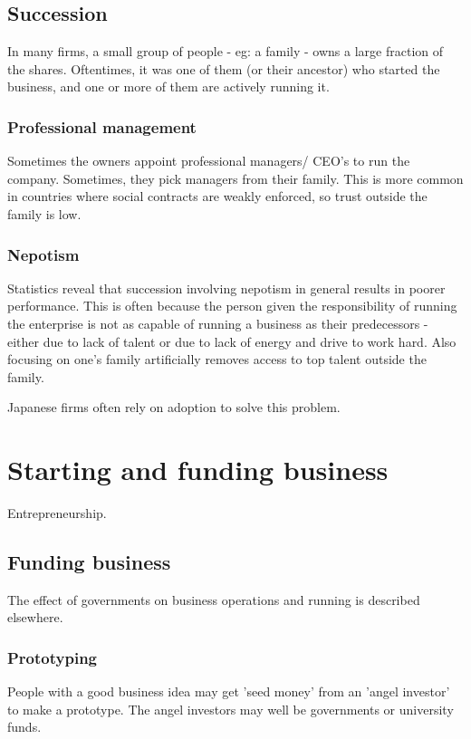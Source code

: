 \documentclass[oneside, article]{memoir}
\begin{document}
\subsection{Succession}
In many firms, a small group of people - eg: a family - owns a large fraction of the shares. Oftentimes, it was one of them (or their ancestor) who started the business, and one or more of them are actively running it.

\subsubsection{Professional management}
Sometimes the owners appoint professional managers/ CEO's to run the company. Sometimes, they pick managers from their family. This is more common in countries where social contracts are weakly enforced, so trust outside the family is low.

\subsubsection{Nepotism}
Statistics reveal that succession involving nepotism in general results in poorer performance. This is often because the person given the responsibility of running the enterprise is not as capable of running a business as their predecessors - either due to lack of talent or due to lack of energy and drive to work hard. Also focusing on one's family artificially removes access to top talent outside the family.

Japanese firms often rely on adoption to solve this problem.

\section{Starting and funding business}
Entrepreneurship.

\subsection{Funding business}
The effect of governments on business operations and running is described elsewhere.

\subsubsection{Prototyping}
People with a good business idea may get 'seed money' from an 'angel investor' to make a prototype. The angel investors may well be governments or university funds.
\end{document}
